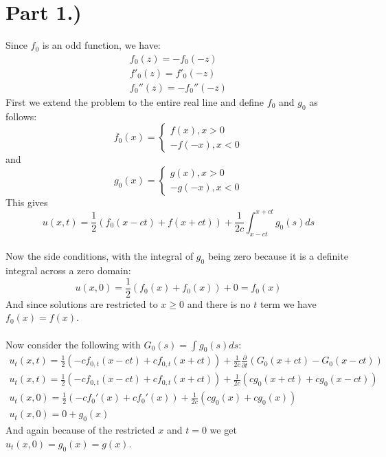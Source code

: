 \documentclass{article}
\begin{document}
\section*{Part 1.)} 
Since $f_0$ is an odd function, we have:
\begin{equation}
\begin{aligned}
f_0(z) = -f_0(-z)\\
f'_0(z) = f'_0(-z)\\
f_0''(z) = -f_0''(-z)
\end{aligned}
\end{equation}
First we extend the problem to the entire real line and define $f_0$ and $g_0$ as follows:
\[f_0(x) =
  \begin{cases}
               f(x) , x > 0\\
               -f(-x), x < 0
            \end{cases}
\]
and
\[g_0(x) =
  \begin{cases}
               g(x) , x > 0\\
               -g(-x), x < 0
            \end{cases}
\]
This gives
\begin{equation}
u(x,t) = \frac{1}{2}(f_0(x-ct) + f(x+ct)) + \frac{1}{2c}\int_{x-ct}^{x+ct}g_0(s)ds
\end{equation}
\\
Now the side conditions, with the integral of $g_0$ being zero because it is a definite integral across a zero domain:
\begin{equation}
u(x,0) = \frac{1}{2}(f_0(x) + f_0(x)) + 0 = f_0(x)
\end{equation}
And since solutions are restricted to $x\geq 0$ and there is no $t$ term we have $f_0(x) = f(x)$.\\
\\
Now consider the following with $G_0(s) = \int g_0(s)ds$:
\begin{equation}
\begin{aligned}
u_t(x, t) = \frac{1}{2}(-cf_{0,t}(x-ct) + cf_{0,t}(x+ct)) + \frac{1}{2c} \frac{\partial}{\partial t}(G_0(x+ct) - G_0(x - ct))\\
u_t(x, t) = \frac{1}{2}(-cf_{0,t}(x-ct) + cf_{0,t}(x+ct)) + \frac{1}{2c}(cg_0(x+ct) + cg_0(x - ct))\\
u_t(x, 0) = \frac{1}{2}(-cf_0'(x) + cf_0'(x)) + \frac{1}{2c}(cg_0(x) + cg_0(x))\\
u_t(x,0) = 0 + g_0(x)
\end{aligned}
\end{equation}
And again because of the restricted $x$ and $t = 0$ we get $u_t(x,0) = g_0(x) = g(x)$.\\
\end{document}
